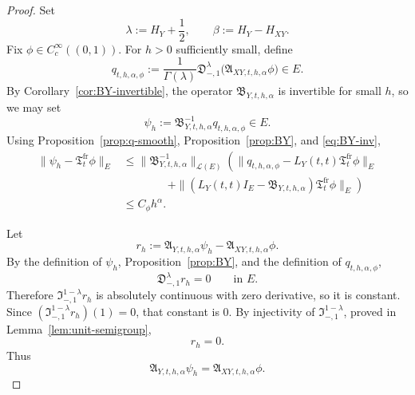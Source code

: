 \documentclass[11pt,a4paper]{amsart}
\theoremstyle{plain}
\theoremstyle{definition}
\theoremstyle{remark}
\begin{document}
\begin{proof}
Set
\[
\lambda:=H_Y+\frac12,
\qquad
\beta:=H_Y-H_{XY}.
\]
Fix \(\phi\in C_c^\infty((0,1))\). For \(h>0\) sufficiently small, define
\[
q_{t,h,\alpha,\phi}
:=
\frac{1}{\Gamma(\lambda)}
\mathfrak D_{-,1}^{\lambda}\bigl(\mathfrak A_{XY,t,h,\alpha}\phi\bigr)\in E.
\]
By Corollary~\ref{cor:BY-invertible}, the operator \(\mathfrak B_{Y,t,h,\alpha}\) is invertible
for small \(h\), so we may set
\[
\psi_h:=\mathfrak B_{Y,t,h,\alpha}^{-1}q_{t,h,\alpha,\phi}\in E.
\]
Using Proposition~\ref{prop:q-smooth}, Proposition~\ref{prop:BY}, and
\eqref{eq:BY-inv},
\begin{align*}
\|\psi_h-\mathfrak T_t^{\mathrm{fr}}\phi\|_E
&\le
\|\mathfrak B_{Y,t,h,\alpha}^{-1}\|_{\mathcal L(E)}
\left(
\|q_{t,h,\alpha,\phi}-L_Y(t,t)\mathfrak T_t^{\mathrm{fr}}\phi\|_E\right. \\
&\qquad\qquad\left.
+\|(L_Y(t,t)I_E-\mathfrak B_{Y,t,h,\alpha})\mathfrak T_t^{\mathrm{fr}}\phi\|_E
\right) \\
&\le
C_\phi h^\alpha.
\end{align*}

Let
\[
r_h:=\mathfrak A_{Y,t,h,\alpha}\psi_h-\mathfrak A_{XY,t,h,\alpha}\phi.
\]
By the definition of \(\psi_h\), Proposition~\ref{prop:BY}, and the definition of
\(q_{t,h,\alpha,\phi}\),
\[
\mathfrak D_{-,1}^{\lambda}r_h=0
\qquad\text{in }E.
\]
Therefore \(\mathfrak I_{-,1}^{1-\lambda}r_h\) is absolutely continuous with zero derivative, so
it is constant. Since \((\mathfrak I_{-,1}^{1-\lambda}r_h)(1)=0\), that constant is \(0\). By
injectivity of \(\mathfrak I_{-,1}^{1-\lambda}\), proved in Lemma~\ref{lem:unit-semigroup},
\[
r_h=0.
\]
Thus
\begin{equation}\label{eq:smooth-local-eq}
\mathfrak A_{Y,t,h,\alpha}\psi_h=\mathfrak A_{XY,t,h,\alpha}\phi.
\end{equation}


\end{proof}
\end{document}
